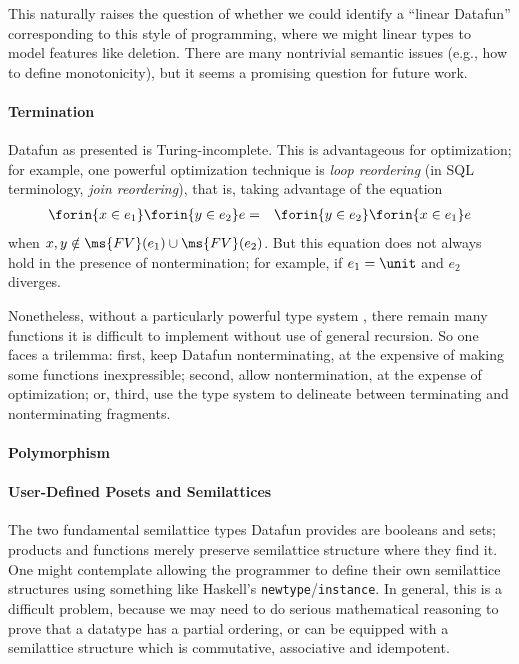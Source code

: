 This naturally raises the question of whether we could identify a
``linear Datafun'' corresponding to this style of programming, where
we might linear types to model features like deletion. There are many
nontrivial semantic issues (e.g., how to define monotonicity), but
it seems a promising question for future work.

\paragraph{Termination}

Datafun as presented is Turing-incomplete. This is advantageous for
optimization; for example, one powerful optimization technique is \emph{loop
  reordering} (in SQL terminology, \emph{join reordering}), that is, taking
advantage of the equation
\begin{eqnarray*}
  \forin{x \in e_1} \forin{y \in e_2} e
  &=& \forin{y \in e_2} \forin{x \in e_1} e
\end{eqnarray*}
when $x,y \notin \ms{FV}(e_1) \cup \ms{FV}(e_2)$. But this equation does not
always hold in the presence of nontermination; for example, if $e_1 = \unit$ and
$e_2$ diverges.

Nonetheless, without a particularly powerful type system , there
remain many functions it is difficult to implement without use of general
recursion. So one faces a trilemma: first, keep Datafun nonterminating, at the
expensive of making some functions inexpressible; second, allow nontermination,
at the expense of optimization; or, third, use the type system to delineate
between terminating and nonterminating fragments.

\paragraph{Polymorphism}

\paragraph{User-Defined Posets and Semilattices}
The two fundamental semilattice types Datafun provides are booleans and sets;
products and functions merely preserve semilattice structure where they find
it. One might contemplate allowing the programmer to define their own
semilattice structures using something like Haskell's
\texttt{newtype}/\texttt{instance}. In general, this is a difficult
problem, because we may need to do serious mathematical
reasoning to prove that a datatype has a partial ordering, or can be
equipped with a semilattice structure which is commutative, associative
and idempotent.

